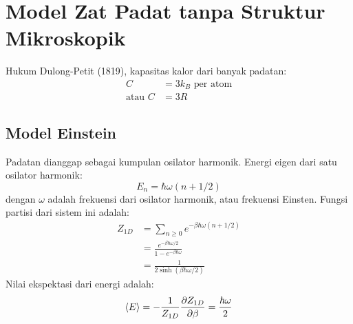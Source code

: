 \chapter{Model Zat Padat tanpa Struktur Mikroskopik}

Hukum Dulong-Petit (1819), kapasitas kalor dari banyak padatan:
\begin{align}
C & = 3k_{B}\,\,\text{per atom} \\
\text{atau}\,\, C & = 3R
\end{align}

\section{Model Einstein}

Padatan dianggap sebagai kumpulan osilator harmonik.
Energi eigen dari satu osilator harmonik:
\begin{equation}
E_{n} = \hbar \omega ( n + 1/2 )
\end{equation}
dengan $\omega$ adalah frekuensi dari osilator harmonik, atau
frekuensi Einsten.
Fungsi partisi dari sistem ini adalah:
\begin{align*}
Z_{1D} & = \sum_{n \geq 0} e^{-\beta\hbar\omega(n + 1/2)} \\
& = \frac{e^{-\beta\hbar\omega/2}}{1 - e^{-\beta\hbar\omega}} \\
& = \frac{1}{2\sinh(\beta\hbar\omega/2)}
\end{align*}
Nilai ekspektasi dari energi adalah:
\begin{align*}
\braket{E} = -\frac{1}{Z_{1D}}\frac{\partial Z_{1D}}{\partial \beta}
= \frac{\hbar\omega}{2}
\end{align*}

